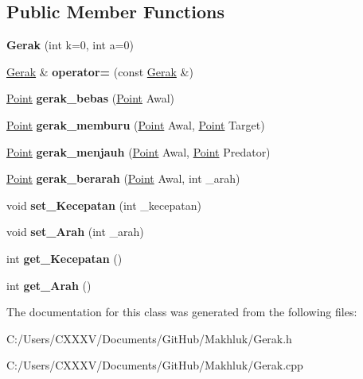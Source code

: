 \subsection*{Public Member Functions}
\begin{DoxyCompactItemize}
\item 
{\bfseries Gerak} (int k=0, int a=0)\hypertarget{class_gerak_a02d91105bf6d068a736b83cb8384771d}{}\label{class_gerak_a02d91105bf6d068a736b83cb8384771d}

\item 
\hyperlink{class_gerak}{Gerak} \& {\bfseries operator=} (const \hyperlink{class_gerak}{Gerak} \&)\hypertarget{class_gerak_a305ed06e393e3e51cfca2ef6e7c76afb}{}\label{class_gerak_a305ed06e393e3e51cfca2ef6e7c76afb}

\item 
\hyperlink{class_point}{Point} {\bfseries gerak\+\_\+bebas} (\hyperlink{class_point}{Point} Awal)\hypertarget{class_gerak_af22d628d35499daa0531c7ec33bc203c}{}\label{class_gerak_af22d628d35499daa0531c7ec33bc203c}

\item 
\hyperlink{class_point}{Point} {\bfseries gerak\+\_\+memburu} (\hyperlink{class_point}{Point} Awal, \hyperlink{class_point}{Point} Target)\hypertarget{class_gerak_ad5580d6323e4c6b4ef8df2b66ae0e3d4}{}\label{class_gerak_ad5580d6323e4c6b4ef8df2b66ae0e3d4}

\item 
\hyperlink{class_point}{Point} {\bfseries gerak\+\_\+menjauh} (\hyperlink{class_point}{Point} Awal, \hyperlink{class_point}{Point} Predator)\hypertarget{class_gerak_a35bd72ee39648608e80e3a6e64529629}{}\label{class_gerak_a35bd72ee39648608e80e3a6e64529629}

\item 
\hyperlink{class_point}{Point} {\bfseries gerak\+\_\+berarah} (\hyperlink{class_point}{Point} Awal, int \+\_\+arah)\hypertarget{class_gerak_adf48f5c13e88979817fc2877e52f0544}{}\label{class_gerak_adf48f5c13e88979817fc2877e52f0544}

\item 
void {\bfseries set\+\_\+\+Kecepatan} (int \+\_\+kecepatan)\hypertarget{class_gerak_aeb2593139ccb712e979d2be884f7b964}{}\label{class_gerak_aeb2593139ccb712e979d2be884f7b964}

\item 
void {\bfseries set\+\_\+\+Arah} (int \+\_\+arah)\hypertarget{class_gerak_a79f2c0d4777b7fdf7828783b4b6ebf59}{}\label{class_gerak_a79f2c0d4777b7fdf7828783b4b6ebf59}

\item 
int {\bfseries get\+\_\+\+Kecepatan} ()\hypertarget{class_gerak_a7c19aee88213b75f332d286458069ccd}{}\label{class_gerak_a7c19aee88213b75f332d286458069ccd}

\item 
int {\bfseries get\+\_\+\+Arah} ()\hypertarget{class_gerak_ae808d0044c5221cf7e265fb43288b51b}{}\label{class_gerak_ae808d0044c5221cf7e265fb43288b51b}

\end{DoxyCompactItemize}


The documentation for this class was generated from the following files\+:\begin{DoxyCompactItemize}
\item 
C\+:/\+Users/\+C\+X\+X\+X\+V/\+Documents/\+Git\+Hub/\+Makhluk/Gerak.\+h\item 
C\+:/\+Users/\+C\+X\+X\+X\+V/\+Documents/\+Git\+Hub/\+Makhluk/Gerak.\+cpp\end{DoxyCompactItemize}
